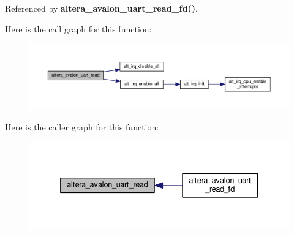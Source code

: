 Referenced by {\bf altera\+\_\+avalon\+\_\+uart\+\_\+read\+\_\+fd()}.



Here is the call graph for this function\+:
\nopagebreak
\begin{figure}[H]
\begin{center}
\leavevmode
\includegraphics[width=350pt]{d1/d76/altera__avalon__uart__read_8c_ac4196c98f309a34938c601b4d5d1b702_cgraph}
\end{center}
\end{figure}




Here is the caller graph for this function\+:
\nopagebreak
\begin{figure}[H]
\begin{center}
\leavevmode
\includegraphics[width=332pt]{d1/d76/altera__avalon__uart__read_8c_ac4196c98f309a34938c601b4d5d1b702_icgraph}
\end{center}
\end{figure}


